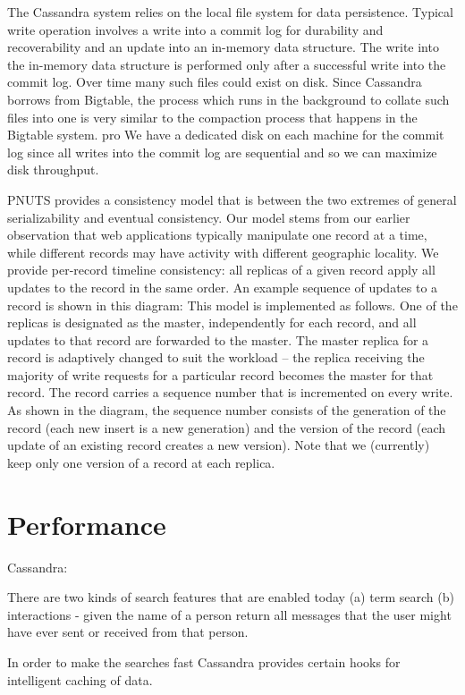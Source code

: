 \documentclass[12pt,letter]{article}
\begin{document}
The Cassandra system relies on the local file system for data persistence. Typical write operation involves a write into a commit log for durability and recoverability and an update into an in-memory data structure. The write into the in-memory data structure is performed only after a successful write into the commit log. Over time many such files could exist on disk. Since Cassandra borrows from Bigtable, the process which runs in the background to collate such files into one is very similar to the compaction process that happens in the  Bigtable system.
pro
We have a dedicated disk on each machine for the commit log since all writes into the commit log are sequential and so we can maximize disk throughput.

PNUTS provides a consistency model that is between the two extremes of general serializability and eventual consistency. Our model stems from our earlier observation that web applications typically manipulate one record at a time, while different records may have activity with different geographic locality. We provide per-record timeline consistency: all replicas of a given record apply all updates to the record in the same order. An example sequence of updates to a record is shown in this diagram:
This model is implemented as follows. One of the replicas is designated as the master, independently for each record, and all updates to that record are forwarded to the master. The master replica for a record is adaptively changed to suit the workload – the replica receiving the majority of write requests for a particular record becomes the master for that record. The record carries a sequence number that is incremented on every write. As shown in the diagram, the sequence number consists of the generation of the record (each new insert is a new generation) and the version of the record (each update of an existing record creates a new version). Note that we (currently) keep only one version of a record at each replica.

\section{Performance}

Cassandra:

There are two kinds of search features that are enabled today (a) term search (b) interactions - given the name of a person return all messages that the user might have ever sent or received from that person.

In order to make the searches fast Cassandra provides certain hooks for intelligent caching of data.
\end{document}
